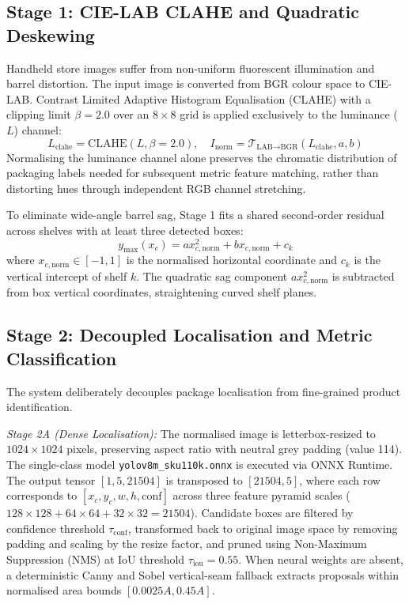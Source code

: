 \documentclass[conference]{IEEEtran}
\begin{document}
\subsection{Stage 1: CIE-LAB CLAHE and Quadratic Deskewing}
Handheld store images suffer from non-uniform fluorescent illumination and barrel distortion. The input image is converted from BGR colour space to CIE-LAB. Contrast Limited Adaptive Histogram Equalisation (CLAHE) with a clipping limit $\beta = 2.0$ over an $8 \times 8$ grid is applied exclusively to the luminance ($L$) channel:
\begin{equation}
L_{\text{clahe}} = \text{CLAHE}(L, \beta=2.0), \quad I_{\text{norm}} = \mathcal{T}_{\text{LAB}\to\text{BGR}}(L_{\text{clahe}}, a, b)
\end{equation}
Normalising the luminance channel alone preserves the chromatic distribution of packaging labels needed for subsequent metric feature matching, rather than distorting hues through independent RGB channel stretching.

To eliminate wide-angle barrel sag, Stage 1 fits a shared second-order residual across shelves with at least three detected boxes:
\begin{equation}
y_{\max}(x_c) = a x_{c,\text{norm}}^2 + b x_{c,\text{norm}} + c_k
\end{equation}
where $x_{c,\text{norm}} \in [-1, 1]$ is the normalised horizontal coordinate and $c_k$ is the vertical intercept of shelf $k$. The quadratic sag component $a x_{c,\text{norm}}^2$ is subtracted from box vertical coordinates, straightening curved shelf planes.

\subsection{Stage 2: Decoupled Localisation and Metric Classification}
The system deliberately decouples package localisation from fine-grained product identification.

\textit{Stage 2A (Dense Localisation):} The normalised image is letterbox-resized to $1024 \times 1024$ pixels, preserving aspect ratio with neutral grey padding (value 114). The single-class model \texttt{yolov8m\_sku110k.onnx} is executed via ONNX Runtime. The output tensor $[1, 5, 21504]$ is transposed to $[21504, 5]$, where each row corresponds to $[x_c, y_c, w, h, \text{conf}]$ across three feature pyramid scales ($128\times 128 + 64\times 64 + 32\times 32 = 21504$). Candidate boxes are filtered by confidence threshold $\tau_{\text{conf}}$, transformed back to original image space by removing padding and scaling by the resize factor, and pruned using Non-Maximum Suppression (NMS) at IoU threshold $\tau_{\text{iou}} = 0.55$. When neural weights are absent, a deterministic Canny and Sobel vertical-seam fallback extracts proposals within normalised area bounds $[0.0025 A, 0.45 A]$.
\end{document}
